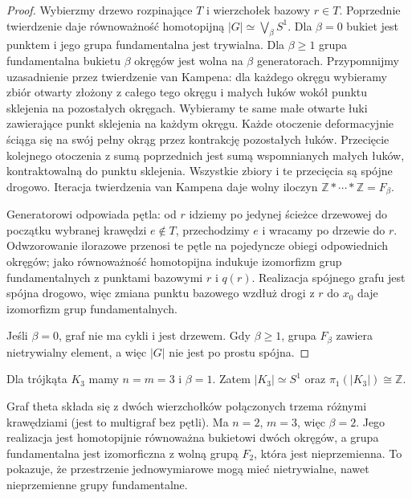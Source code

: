 \begin{proof}
Wybierzmy drzewo rozpinające $T$ i wierzchołek bazowy
$r\in T$. Poprzednie twierdzenie daje równoważność
homotopijną $|G|\simeq\bigvee_\beta S^1$.
Dla $\beta=0$ bukiet jest punktem i jego grupa
fundamentalna jest trywialna. Dla $\beta\geq1$
grupa fundamentalna bukietu $\beta$ okręgów jest wolna
na $\beta$ generatorach. Przypomnijmy uzasadnienie
przez twierdzenie van Kampena: dla każdego okręgu
wybieramy zbiór otwarty złożony z całego tego okręgu
i małych łuków wokół punktu sklejenia na pozostałych
okręgach. Wybieramy te same małe otwarte łuki zawierające
punkt sklejenia na każdym okręgu. Każde otoczenie
deformacyjnie ściąga się na swój pełny okrąg
przez kontrakcję pozostałych łuków. Przecięcie
kolejnego otoczenia z sumą poprzednich jest sumą
wspomnianych małych łuków, kontraktowalną do punktu
sklejenia. Wszystkie zbiory i te przecięcia są
spójne drogowo. Iteracja twierdzenia van Kampena
daje wolny iloczyn $\mathbb Z*\cdots*\mathbb Z=F_\beta$.

Generatorowi odpowiada pętla: od $r$ idziemy po jedynej
ścieżce drzewowej do początku wybranej krawędzi
$e\notin T$, przechodzimy $e$ i wracamy po drzewie do $r$.
Odwzorowanie ilorazowe przenosi te pętle na pojedyncze
obiegi odpowiednich okręgów; jako równoważność homotopijna
indukuje izomorfizm grup fundamentalnych z punktami
bazowymi $r$ i $q(r)$. Realizacja spójnego grafu jest
spójna drogowo, więc zmiana punktu bazowego wzdłuż drogi
z $r$ do $x_0$ daje izomorfizm grup fundamentalnych.

Jeśli $\beta=0$, graf nie ma cykli i jest drzewem.
Gdy $\beta\ge1$, grupa $F_\beta$ zawiera nietrywialny element, a więc $|G|$ nie jest po prostu spójna.
\end{proof}

\begin{przyklad}
Dla trójkąta $K_3$ mamy $n=m=3$ i $\beta=1$.
Zatem $|K_3|\simeq S^1$ oraz
$\pi_1(|K_3|)\cong\mathbb Z$.

Graf theta składa się z dwóch wierzchołków połączonych
trzema różnymi krawędziami (jest to multigraf bez pętli).
Ma $n=2$, $m=3$, więc $\beta=2$.
Jego realizacja jest homotopijnie równoważna bukietowi
dwóch okręgów, a grupa fundamentalna jest izomorficzna
z wolną grupą $F_2$, która jest nieprzemienna.
To pokazuje, że przestrzenie jednowymiarowe mogą mieć
nietrywialne, nawet nieprzemienne grupy fundamentalne.
\end{przyklad}

\begin{center}
\end{center}

